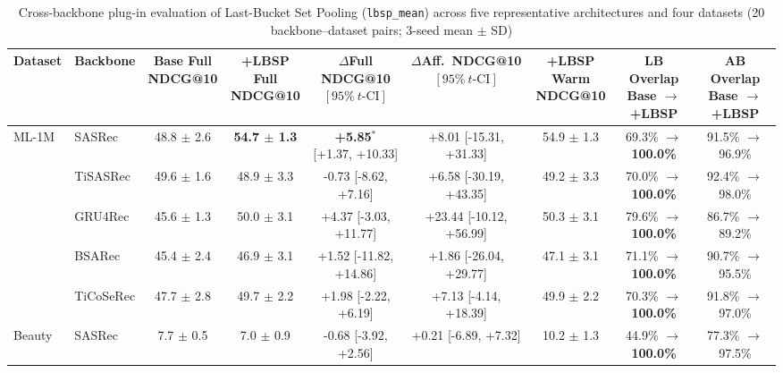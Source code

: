 \begin{table}[!htbp]
\centering
\caption{Cross-backbone plug-in evaluation of Last-Bucket Set Pooling (\texttt{lbsp\_mean}) across five representative architectures and four datasets (20 backbone--dataset pairs; 3-seed mean $\pm$ SD)}
\label{tab:cross-backbone-lbsp}
\fontsize{7.8}{9.8}\selectfont
\setlength{\tabcolsep}{2.4pt}
\renewcommand{\arraystretch}{1.12}
\noindent\begin{tabular*}{\textwidth}{@{\extracolsep{\fill}}llccccccc@{}}
\toprule
Dataset & Backbone & \shortstack{Base Full\\NDCG@10} & \shortstack{+LBSP Full\\NDCG@10} & \shortstack{$\Delta$Full NDCG@10\\$[95\%\ t\text{-CI}]$} & \shortstack{$\Delta$Aff.\ NDCG@10\\$[95\%\ t\text{-CI}]$} & \shortstack{+LBSP Warm\\NDCG@10} & \shortstack{LB Overlap\\Base $\to$ +LBSP} & \shortstack{AB Overlap\\Base $\to$ +LBSP} \\
\midrule
ML-1M & SASRec & 48.8 $\pm$ 2.6 & \textbf{54.7 $\pm$ 1.3} & \textbf{+5.85$^{*}$} \scriptsize{[+1.37, +10.33]} & +8.01 \scriptsize{[-15.31, +31.33]} & 54.9 $\pm$ 1.3 & 69.3\% $\to$ \textbf{100.0\%} & 91.5\% $\to$ 96.9\% \\
 & TiSASRec & 49.6 $\pm$ 1.6 & 48.9 $\pm$ 3.3 & -0.73 \scriptsize{[-8.62, +7.16]} & +6.58 \scriptsize{[-30.19, +43.35]} & 49.2 $\pm$ 3.3 & 70.0\% $\to$ \textbf{100.0\%} & 92.4\% $\to$ 98.0\% \\
 & GRU4Rec & 45.6 $\pm$ 1.3 & 50.0 $\pm$ 3.1 & +4.37 \scriptsize{[-3.03, +11.77]} & +23.44 \scriptsize{[-10.12, +56.99]} & 50.3 $\pm$ 3.1 & 79.6\% $\to$ \textbf{100.0\%} & 86.7\% $\to$ 89.2\% \\
 & BSARec & 45.4 $\pm$ 2.4 & 46.9 $\pm$ 3.1 & +1.52 \scriptsize{[-11.82, +14.86]} & +1.86 \scriptsize{[-26.04, +29.77]} & 47.1 $\pm$ 3.1 & 71.1\% $\to$ \textbf{100.0\%} & 90.7\% $\to$ 95.5\% \\
 & TiCoSeRec & 47.7 $\pm$ 2.8 & 49.7 $\pm$ 2.2 & +1.98 \scriptsize{[-2.22, +6.19]} & +7.13 \scriptsize{[-4.14, +18.39]} & 49.9 $\pm$ 2.2 & 70.3\% $\to$ \textbf{100.0\%} & 91.8\% $\to$ 97.0\% \\
\midrule
Beauty & SASRec & 7.7 $\pm$ 0.5 & 7.0 $\pm$ 0.9 & -0.68 \scriptsize{[-3.92, +2.56]} & +0.21 \scriptsize{[-6.89, +7.32]} & 10.2 $\pm$ 1.3 & 44.9\% $\to$ \textbf{100.0\%} & 77.3\% $\to$ 97.5\% \\

\end{tabular*}
\end{table}
